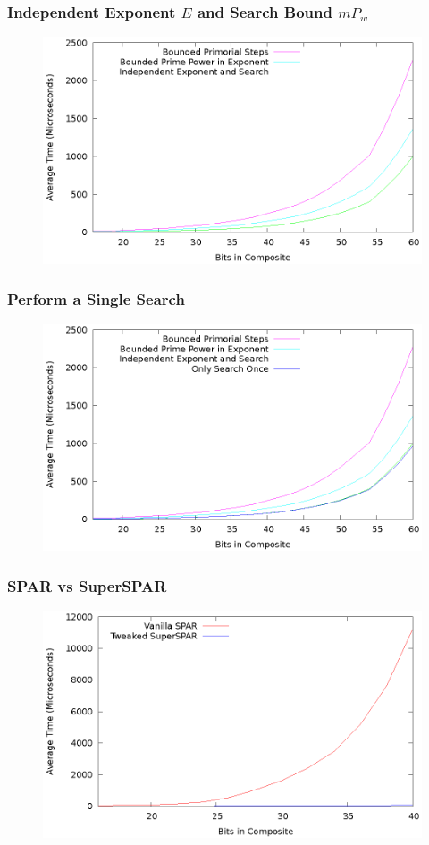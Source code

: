 \documentclass{beamer}
\begin{document}
\begin{frame}
\frametitle{Independent Exponent $E$ and Search Bound $mP_w$}
\begin{figure}
\includegraphics[scale=0.86]{sspar-noreuse}
\end{figure}
\end{frame}
\begin{frame}
\frametitle{Perform a Single Search}
\begin{figure}
\includegraphics[scale=0.86]{sspar-optimized}
\end{figure}
\end{frame}
\begin{frame}
\frametitle{SPAR vs SuperSPAR}
\begin{figure}
\includegraphics[scale=0.86]{spar-vs-sspar}
\end{figure}
\end{frame}
\end{document}
